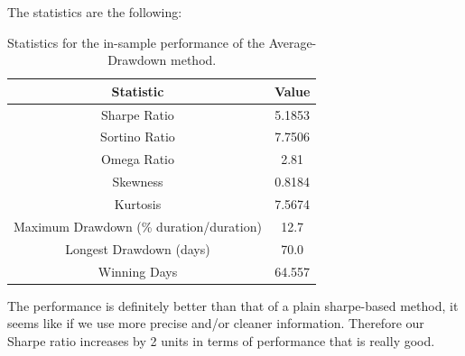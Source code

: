 The statistics are the following:

\begin{table}
	\centering
	\begin{tabular}{c|c}
		\textbf{Statistic} & \textbf{Value} \\\hline
		Sharpe Ratio & 5.1853 \\ 
		Sortino Ratio & 7.7506 \\ 
		Omega Ratio & 2.81 \\ 
		Skewness & 0.8184 \\ 
		Kurtosis & 7.5674 \\ 
		Maximum Drawdown (\% duration/duration) & 12.7 \\ 
		Longest Drawdown (days) & 70.0 \\ 
		Winning Days & 64.557 \\ 
	\end{tabular}
	\caption{\label{tab:widgets} Statistics for the in-sample performance of the Average-Drawdown method.}
\end{table}

The performance is definitely better than that of a plain sharpe-based method, it seems like if we use more precise and/or cleaner information. Therefore our Sharpe ratio increases by 2 units in terms of performance that is really good. 